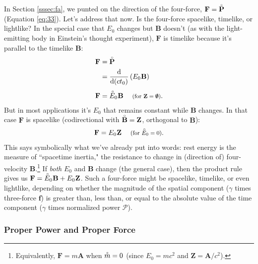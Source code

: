 \documentclass[12pt]{article}
\renewcommand{\mathring}[1]{\accentset{\circ}{#1}}
\renewcommand{\vv}[1]{\mathbf{#1}}
\newcommand{\dd}[1]{\mathrm{d}#1}
\begin{document}
In Section \ref{sssec:fa}, we punted on the direction of the four-force, $\vv F = \mathring{\vv P}$ (Equation \ref{eq:33}). Let's address that now. Is the four-force spacelike, timelike, or lightlike? In the special case that $E_0$ changes but $\vv B$ doesn't (as with the light-emitting body in Einstein's thought experiment), $\vv F$ is timelike because it's parallel to the timelike $\vv B$:
\begin{equation}\label{eq:38}
\begin{split}
\vv F &= \mathring{\vv P}\\
&= \frac{\dd}{\dd (c t_0)} \left( E_0 \mkern.5mu \vv B \right) \\[4pt]
\vv F &= \mathring{E}_0 \mkern.5mu \vv B \quad \textrm{\footnotesize{ (for $\vv Z = \textrm{\mbox{\boldmath $\emptyset$}}$)}}.
\end{split}
\end{equation}
But in most applications it's $E_0$ that remains constant while $\vv B$ changes. In that case $\vv F$ is spacelike (codirectional with $\mathring{\vv B} = \vv Z$, orthogonal to $\vv B$):
\begin{equation}\label{eq:39}
\vv F = E_0 \mkern.5mu \vv Z \quad \textrm{\footnotesize{ (for $\mathring{E}_0 = 0$)}}.
\end{equation}
This says symbolically what we've already put into words: rest energy is the measure of ``spacetime inertia," the resistance to change in (direction of) four-velocity $\vv B$.\footnote{Equivalently, $\vv F = m \vv A$ when $\mathring{m} = 0$ (since $E_0 = mc^2$ and $\vv Z = \vv A / c^2$).} If \emph{both} $E_0$ and $\vv B$ change (the general case), then the product rule gives us $\vv F = \mathring{E}_0 \mkern.5mu \vv B + E_0 \mkern.5mu \vv Z$. Such a four-force might be spacelike, timelike, or even lightlike, depending on whether the magnitude of the spatial component ($\gamma$ times three-force $\vv f$) is greater than, less than, or equal to the absolute value of the time component ($\gamma$ times normalized power $\mathcal{P}$).

\subsubsection{Proper Power and Proper Force}\label{sssec:pf}
\end{document}
